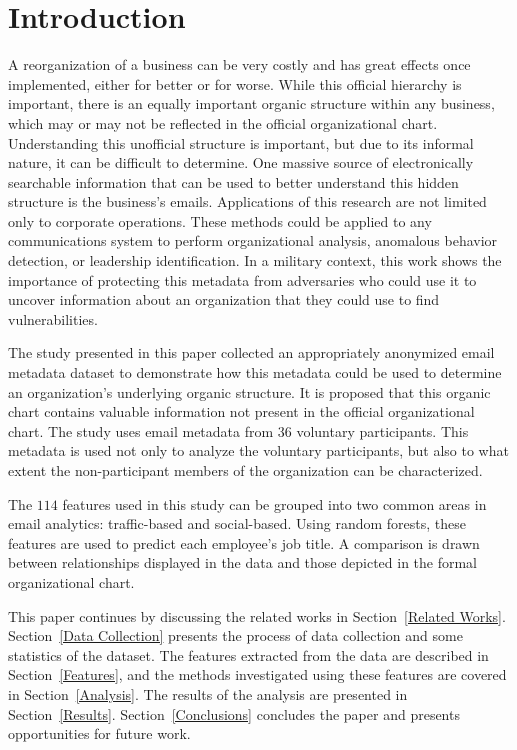 \documentclass[10pt,twocolumn,conference]{IEEEtran}
\begin{document}
\section{Introduction}
A reorganization of a business can be very costly and has great effects once implemented, either for better or for worse.
While this official hierarchy is important, there is an equally important organic structure within any business, which may or may not be reflected in the official organizational chart.
Understanding this unofficial structure is important, but due to its informal nature, it can be difficult to determine.
One massive source of electronically searchable information that can be used to better understand this hidden structure is the business's emails.
Applications of this research are not limited only to corporate operations.
These methods could be applied to any communications system to perform organizational analysis, anomalous behavior detection, or leadership identification.
In a military context, this work shows the importance of protecting this metadata from adversaries who could use it to uncover information about an organization that they could use to find vulnerabilities.

The study presented in this paper collected an appropriately anonymized email metadata dataset to demonstrate how this metadata could be used to determine an organization's underlying organic structure.
It is proposed that this organic chart contains valuable information not present in the official organizational chart.
The study uses email metadata from $36$ voluntary participants.
This metadata is used not only to analyze the voluntary participants, but also to what extent the non-participant members of the organization can be characterized.

The $114$ features used in this study can be grouped into two common areas in email analytics: traffic-based and social-based.
Using random forests, these features are used to predict each employee's job title.
A comparison is drawn between relationships displayed in the data and those depicted in the formal organizational chart.  

This paper continues by discussing the related works in Section~\ref{Related Works}.
Section~\ref{Data Collection} presents the process of data collection and some statistics of the dataset.
The features extracted from the data are described in Section~\ref{Features}, and the methods investigated using these features are covered in Section~\ref{Analysis}.
The results of the analysis are presented in Section~\ref{Results}.
Section~\ref{Conclusions} concludes the paper and presents opportunities for future work.  
\end{document}
